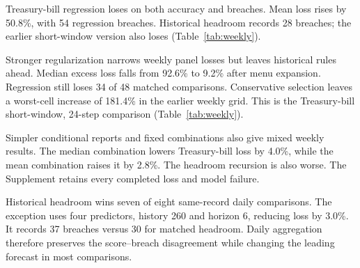 \documentclass[11pt,a4paper]{article}
\begin{document}
Treasury-bill regression loses on both accuracy and breaches. Mean loss rises by 50.8\%, with 54 regression breaches. Historical headroom records 28 breaches; the earlier short-window version also loses (Table~\ref{tab:weekly}).

Stronger regularization narrows weekly panel losses but leaves historical rules ahead. Median excess loss falls from 92.6\% to 9.2\% after menu expansion. Regression still loses 34 of 48 matched comparisons. Conservative selection leaves a worst-cell increase of 181.4\% in the earlier weekly grid. This is the Treasury-bill short-window, 24-step comparison (Table~\ref{tab:weekly}).

Simpler conditional reports and fixed combinations also give mixed weekly results. The median combination lowers Treasury-bill loss by 4.0\%, while the mean combination raises it by 2.8\%. The headroom recursion is also worse. The Supplement retains every completed loss and model failure.

Historical headroom wins seven of eight same-record daily comparisons. The exception uses four predictors, history 260 and horizon 6, reducing loss by 3.0\%. It records 37 breaches versus 30 for matched headroom. Daily aggregation therefore preserves the score--breach disagreement while changing the leading forecast in most comparisons.
\end{document}
